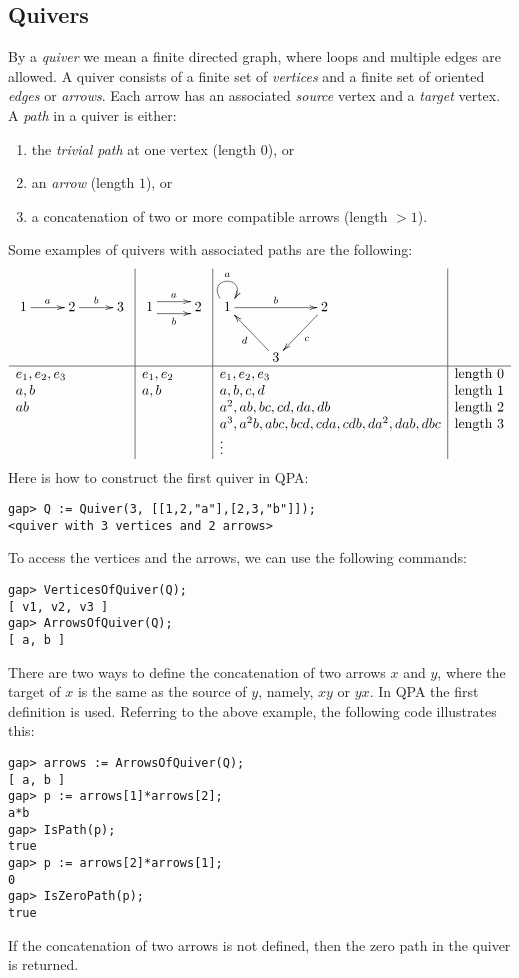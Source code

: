 \documentclass{amsart}
\theoremstyle{definition}
\theoremstyle{theoretic}
\begin{document}
\subsection{Quivers}
By a \emph{quiver} we mean a finite directed graph, where loops and
multiple edges are allowed.  A quiver consists of a finite set of
\emph{vertices} and a finite set of oriented \emph{edges} or
\emph{arrows}.  Each arrow has an associated \emph{source} vertex and
a \emph{target} vertex.  A \emph{path} in a quiver is either:
\begin{enumerate}[\rm(i)]
\item the \emph{trivial path} at one vertex (length $0$), or
\item an \emph{arrow} (length $1$), or 
\item a concatenation of two or more compatible arrows (length $> 1$).
\end{enumerate}  
Some examples of quivers with associated paths are the following:
\[\begin{array}{l|l|l|l}
\xymatrix{1\ar[r]^a & 2\ar[r]^b & 3}  &
\xymatrix{1\ar@<1ex>[r]^a\ar@<-1ex>[r]_b & 2} & 
\xymatrix{1\ar@(ul,ur)^a\ar[rr]^b & & 2\ar[dl]^c \\ & 3\ar[ul]^d & } &
\\ \hline
e_1, e_2, e_3 & e_1, e_2 & e_1, e_2, e_3 & \textrm{length 0}\\
a, b & a, b & a, b, c, d & \textrm{length 1}\\
ab & & a^2, ab, bc, cd, da, db & \textrm{length 2}\\
& & a^3, a^2b, abc, bcd, cda, cdb, da^2, dab, dbc & \textrm{length 3}\\
& & \vdots & 
\end{array}\]
Here is how to construct the first quiver in QPA:
\begin{verbatim}
gap> Q := Quiver(3, [[1,2,"a"],[2,3,"b"]]); 
<quiver with 3 vertices and 2 arrows>
\end{verbatim} 
To access the vertices and the arrows, we can use the following commands:
\begin{verbatim}
gap> VerticesOfQuiver(Q);
[ v1, v2, v3 ]
gap> ArrowsOfQuiver(Q);
[ a, b ]
\end{verbatim}
There are two ways to define the concatenation of two arrows $x$ and
$y$, where the target of $x$ is the same as the source of $y$, namely,
$xy$ or $yx$.  In QPA the first definition is used.  Referring to the
above example, the following code illustrates this:
\begin{verbatim}
gap> arrows := ArrowsOfQuiver(Q);
[ a, b ]
gap> p := arrows[1]*arrows[2];
a*b
gap> IsPath(p);
true
gap> p := arrows[2]*arrows[1];
0
gap> IsZeroPath(p);
true
\end{verbatim}
If the concatenation of two arrows is not defined, then the zero path
in the quiver is returned.  
\end{document}
